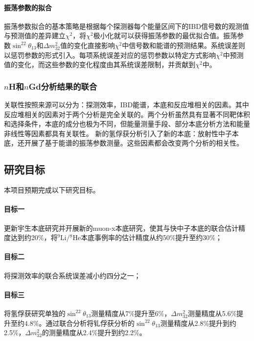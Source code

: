 \documentclass[a4paper,zihao=-4]{article}
\begin{document}
\paragraph{振荡参数的拟合}
振荡参数拟合的基本策略是根据每个探测器每个能量区间下的IBD信号数的观测值与预测值的差异建立$\chi^2$，将$\chi^2$极小化就可以获得振荡参数的最优拟合值。振荡参数$\sin^22\theta_{13}$和$\Delta m_{32}^2$值的变化直接影响$\chi^2$中信号数和能谱的预测结果。系统误差则以惩罚参数的形式引入。每项系统误差对应的惩罚参数以特定方式影响$\chi^2$中预测值的变化，而这些参数的变化程度由其系统误差限制，并贡献到$\chi^2$中。

\subsubsection{$n$H和$n$Gd分析结果的联合}\label{sec:nGdnH-combine}
关联性按照来源可以分为：探测效率，IBD能谱，本底和反应堆相关的因素。其中反应堆相关的因素对于两个分析是完全关联的。两个分析虽然具有显著不同靶体积和选择条件，本底的成分也极为不同，但能量测量手段、部分本底分析方法和能量非线性等因素都具有关联性。 新的氢俘获分析引入了新的本底：放射性中子本底，还开展了基于能谱的振荡参数测量。这些因素都会改变两个分析的相关性。

\subsection{研究目标}
本项目预期完成以下研究目标。

\paragraph{目标一} 更新宇生本底研究并开展新的muon-x本底研究，使其与快中子本底的联合估计精度达到约20\%，将$^9$Li/$^8$He本底事例率的估计精度从约50\%提升至约30\%；
\paragraph{目标二} 将探测效率的联合系统误差减小约四分之一；
\paragraph{目标三} 将氢俘获研究单独的$\sin^22\theta_{13}$测量精度从7\%提升至6\%，$\Delta m_{32}^2$测量精度从5.6\%提升至约4.8\%。通过联合分析将钆俘获分析的$\sin^22\theta_{13}$测量精度从2.8\%提升到约2.5\%，$\Delta m_{32}^2$的测量精度从2.4\%提升到约2.2\%。
\end{document}
